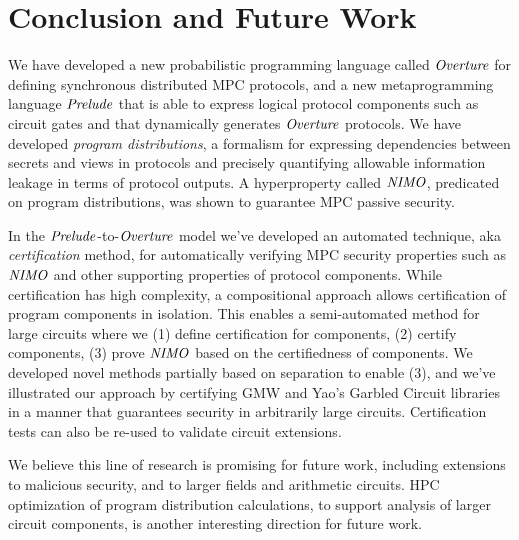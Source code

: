 \section{Conclusion and Future Work}
\label{section-conclusion}

We have developed a new probabilistic programming language called
$\mathit{Overture}$ for defining synchronous distributed MPC protocols, and a new
metaprogramming language $\mathit{Prelude}$ that is able to express logical
protocol components such as circuit gates and that dynamically
generates $\mathit{Overture}$ protocols. We have developed \emph{program
distributions}, a formalism for expressing dependencies between
secrets and views in protocols and precisely quantifying allowable
information leakage in terms of protocol outputs. 
A hyperproperty called $\mathit{NIMO}$, predicated on program distributions,
was shown to guarantee MPC passive security. 

In the $\mathit{Prelude}$-to-$\mathit{Overture}$ model we've developed an automated
technique, aka \emph{certification} method, for automatically
verifying MPC security properties such as $\mathit{NIMO}$ and other supporting
properties of protocol components.  While certification has high
complexity, a compositional approach allows certification of program
components in isolation.  This enables a semi-automated method for
large circuits where we (1) define certification for components, (2)
certify components, (3) prove $\mathit{NIMO}$ based on the certifiedness of
components. We developed novel methods partially based on separation
to enable (3), and we've illustrated our approach by certifying GMW
and Yao's Garbled Circuit libraries in a manner that guarantees
security in arbitrarily large circuits. Certification tests can also
be re-used to validate circuit extensions.

We believe this line of research is promising for future work,
including extensions to malicious security, and to larger fields and
arithmetic circuits. HPC optimization of program distribution
calculations, to support analysis of larger circuit components, is
another interesting direction for future work.

